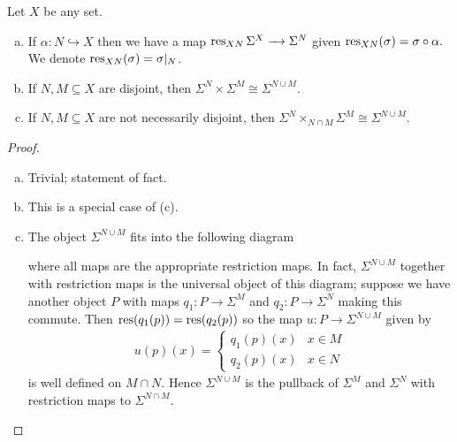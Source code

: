 \documentclass{article}
\begin{document}
\begin{prop}Let $X$ be any set.
  \begin{enumerate}[(a)]
    \item If $\alpha:N \hookrightarrow X$ then we have a map $\res_{XN}\Sigma^X \to \Sigma^N$ given $\operatorname{res}_{XN}(\sigma) = \sigma \circ \alpha.$ We denote $\operatorname{res}_{XN}(\sigma) = \sigma|_N$.
  \item If $N, M \subseteq X$ are disjoint, then $\Sigma^N \times \Sigma^M \cong \Sigma^{N \cup M}$. 
  \item If $N, M \subseteq X$ are not necessarily disjoint, then $\Sigma^N \times_{N\cap M} \Sigma^M \cong \Sigma^{N\cup M}$.
  \end{enumerate}
\end{prop}
\begin{proof}$ $
  \begin{enumerate}[(a)]
    \item Trivial; statement of fact.
    \item This is a special case of (c).
    \item The object $\Sigma^{N\cup M}$ fits into the following diagram
      \begin{center}
      \end{center}
      where all maps are the appropriate restriction maps. In fact, $\Sigma^{N\cup M}$ together with restriction maps is the universal object of this diagram; suppose we have another object $P$ with maps $q_1:P \to \Sigma^M$ and $q_2:P\to \Sigma^N$ making this commute. Then $\operatorname{res}(q_1(p)) = \operatorname{res}(q_2(p))$ so the map $u: P\to \Sigma^{N\cup M}$ given by
      \begin{align*}
        u(p)(x) =
        \begin{cases}
          q_1(p)(x) & x \in M \\
          q_2(p)(x) & x \in N
        \end{cases}
      \end{align*}
      is well defined on $M\cap N$. Hence $\Sigma^{N\cup M}$ is the pullback of $\Sigma^M$ and $\Sigma^N$ with restriction maps to $\Sigma^{N\cap M}$.
  \end{enumerate}
\end{proof}
\end{document}
